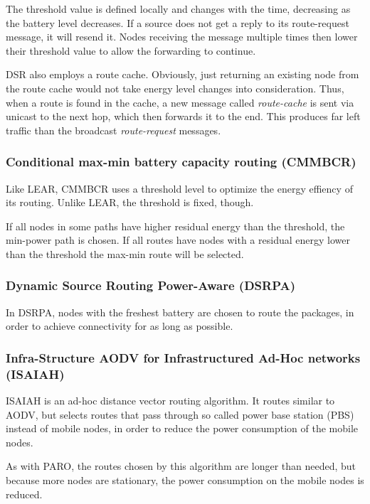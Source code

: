 \documentclass[conference]{IEEEtran}
\begin{document}
The threshold value is defined locally and changes with the time, decreasing
as the battery level decreases. If a source does not get a reply to its
route-request message, it will resend it. Nodes receiving the message multiple
times then lower their threshold value to allow the forwarding to continue.

DSR also employs a route cache. Obviously, just returning an existing node
from the route cache would not take energy level changes into consideration.
Thus, when a route is found in the cache, a new message called \textit{route-cache}
is sent via unicast to the next hop, which then forwards it to the end. This
produces far left traffic than the broadcast \textit{route-request} messages.

\subsubsection{Conditional max-min battery capacity routing (CMMBCR)}
Like LEAR, CMMBCR\cite{toh2001maximum} uses a threshold level to optimize
the energy effiency of its routing.
Unlike LEAR, the threshold is fixed, though.

If all nodes in some paths have higher residual energy than the threshold,
the min-power path is chosen.
If all routes have nodes with a residual energy lower than the threshold the
max-min route will be selected.

\subsubsection{Dynamic Source Routing Power-Aware (DSRPA)}
In DSRPA\cite{djenouri2006dynamic}, nodes with the freshest battery are
chosen to route the packages, in order to achieve connectivity for as
long as possible.\cite{alotaibi2012survey}

\subsubsection{Infra-Structure AODV for Infrastructured Ad-Hoc networks (ISAIAH)}
ISAIAH\cite{lindgren2002infrastructured} is an ad-hoc distance vector routing
algorithm. It routes similar to AODV, but selects routes that pass through
so called power base station (PBS) instead of mobile nodes, in order to reduce
the power consumption of the mobile nodes.

As with PARO, the routes chosen by this algorithm are longer than needed, but
because more nodes are stationary, the power consumption on the mobile nodes
is reduced.
\end{document}
